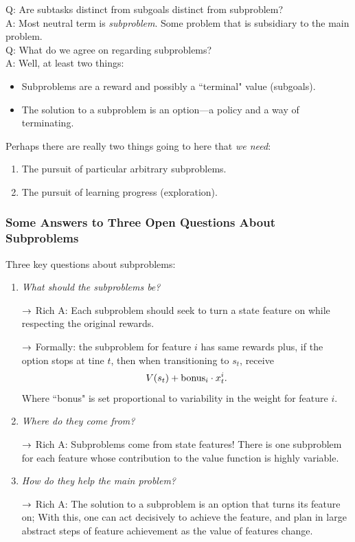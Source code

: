 Q: Are subtasks distinct from subgoals distinct from subproblem? \\

A: Most neutral term is {\it subproblem}. Some problem that is subsidiary to the main problem. \\
Q: What do we agree on regarding subproblems? \\

A: Well, at least two things:
\begin{itemize}
    \item Subproblems are a reward and possibly a ``terminal" value (subgoals).
    \item The solution to a subproblem is an option---a policy and a way of terminating.
\end{itemize}

Perhaps there are really two things going to here that {\it we need}:
\begin{enumerate}
    \item The pursuit of particular arbitrary subproblems.
    \item The pursuit of learning progress (exploration).
\end{enumerate}

\subsubsection{Some Answers to Three Open Questions About Subproblems}

Three key questions about subproblems:
\begin{enumerate}
    \item {\it What should the subproblems be?}
    
    $\rightarrow$ Rich A: Each subproblem should seek to turn a state feature on while respecting the original rewards.
    
    $\rightarrow$ Formally: the subproblem for feature $i$ has same rewards plus, if the option stops at tine $t$, then when transitioning to $s_t$, receive
    \[
    V(s_t) + \text{bonus}_i \cdot x_t^i.
    \]
    Where ``bonus" is set proportional to variability in the weight for feature $i$.
    
    \item {\it Where do they come from?}
    
    $\rightarrow$ Rich A: Subproblems come from state features! There is one subproblem for each feature whose contribution to the value function is highly variable.
    
    
    \item {\it How do they help the main problem?}
    
    $\rightarrow$ Rich A: The solution to a subproblem is an option that turns its feature on; With this, one can act decisively to achieve the feature, and plan in large abstract steps of feature achievement as the value of features change.
\end{enumerate}



